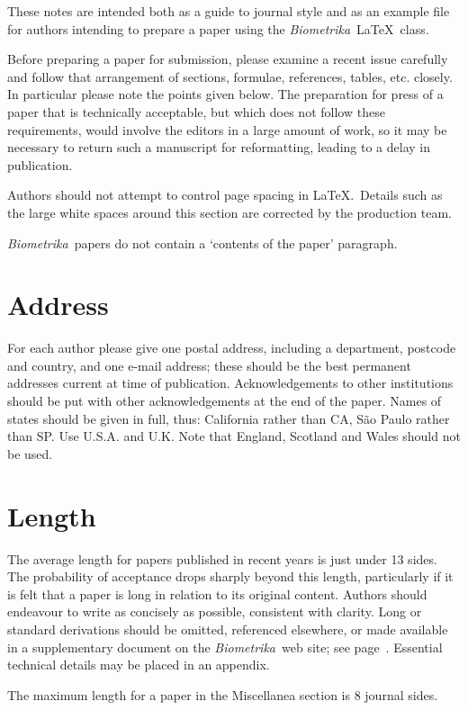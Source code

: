 \documentclass[lineno]{biometrika}
\def\Bka{{\it Biometrika}}
\begin{document}
These notes are intended both as a guide to journal style and as an example file for authors intending to prepare a paper using  the \Bka\ \LaTeX\ class.

Before preparing a paper for submission, please examine a recent issue carefully and follow that arrangement of sections, formulae, references, tables, etc. closely. In particular please note the points given below. The preparation for press of a paper that is technically acceptable, but which does not follow these requirements, would involve the editors in a large amount of work, so it may be necessary to return such a manuscript for reformatting, leading to a delay in publication.

Authors should not attempt to control page spacing in \LaTeX.\  Details such as the large white spaces around this section are corrected by the production team.

\Bka\  papers do not contain a `contents of the paper' paragraph.

\section{Address}

For each author please give one postal address, including a department, postcode and country, and one e-mail address; these should be the best permanent addresses current at time of publication. Acknowledgements to other institutions should be put with other acknowledgements at the end of the paper. Names of states should be given in full, thus: California rather than CA, S\~ao Paulo rather than SP. Use U.S.A. and U.K. Note that England, Scotland and Wales should not be used.

\section{Length}

The average length for papers published in recent years is just under 13 sides.  The probability of acceptance drops sharply beyond this length, particularly if it is felt that a paper is long in relation to its original content.  Authors should endeavour to write as concisely as possible,  consistent with clarity.  Long or standard derivations should be omitted, referenced elsewhere, or made available in a supplementary document on the \Bka\ web site; see page~\pageref{SM}.  Essential technical details may be placed in an appendix.

The maximum length for a paper in the Miscellanea section is 8 journal sides.
\end{document}

